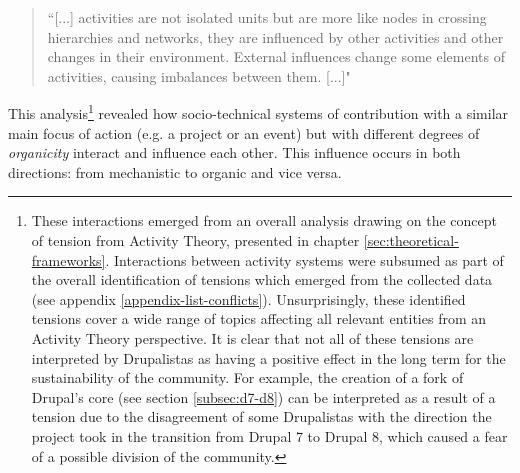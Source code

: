 \begin{quotation}
``[...] activities are not isolated units but are more like nodes in crossing hierarchies and networks, they are influenced by other activities and other changes in their environment. External influences change some elements of activities, causing imbalances between them. [...]"
\end{quotation}

This analysis\footnote{These interactions emerged from an overall analysis drawing on the concept of tension from Activity Theory, presented in chapter \ref{sec:theoretical-frameworks}. Interactions between activity systems were subsumed as part of the overall identification of tensions which emerged from the collected data (see appendix \ref{appendix-list-conflicts}). Unsurprisingly, these identified tensions cover a wide range of topics affecting all relevant entities from an Activity Theory perspective. It is clear that not all of these tensions are interpreted by Drupalistas as having a positive effect in the long term for the sustainability of the community. For example, the creation of a fork of Drupal's core (see section \ref{subsec:d7-d8}) can be interpreted as a result of a tension due to the disagreement of some Drupalistas with the direction the project took in the transition from Drupal 7 to Drupal 8, which caused a fear of a possible division of the community.} revealed how socio-technical systems of contribution with a similar main focus of action (e.g. a project or an event) but with different degrees of \textit{organicity} interact and influence each other. This influence occurs in both directions: from mechanistic to organic and vice versa. 

